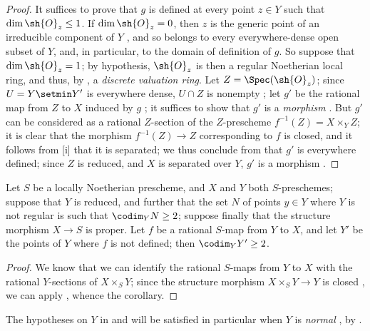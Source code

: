 \begin{proof}
It suffices to prove that $g$ is defined at every point $z\in Y$ such that $\dim\sh{O}_z\leq1$.
If $\dim\sh{O}_z=0$, then $z$ is the generic point of an irreducible component of $Y$ , and so belongs to every everywhere-dense open subset of $Y$, and, in particular, to the domain of definition of $g$.
So suppose that $\dim\sh{O}_z=1$; by hypothesis, $\sh{O}_z$ is then a regular Noetherian local ring, and thus, by , a \emph{discrete valuation ring}.
Let $Z=\Spec(\sh{O}_z)$;
since $U=Y\setmin Y'$ is everywhere dense, $U\cap Z$ is nonempty ;
let $g'$ be the rational map from $Z$ to $X$ induced by $g$ ;
it suffices to show that $g'$ is a \emph{morphism} .
But $g'$ can be considered as a rational $Z$-section of the $Z$-prescheme $f^{-1}(Z)=X\times_Y Z$;
it is clear that the morphism $f^{-1}(Z)\to Z$ corresponding to $f$ is closed, and it follows from [i] that it is separated;
we thus conclude from  that $g'$ is everywhere defined;
since $Z$ is reduced, and $X$ is separated over $Y$, $g'$ is a morphism .
\end{proof}

\begin{corollary}[7.3.6]
\label{II.7.3.6}
Let $S$ be a locally Noetherian prescheme, and $X$ and $Y$ both $S$-preschemes;
suppose that $Y$ is reduced, and further that the set $N$ of points $y\in Y$ where $Y$ is not regular is such that $\codim_Y N\geq2$;
suppose finally that the structure morphism $X\to S$ is proper.
Let $f$ be a rational $S$-map from $Y$ to $X$, and let $Y'$ be the points of $Y$ where $f$ is not defined;
then $\codim_Y Y'\geq2$.
\end{corollary}

\begin{proof}
We know  that we can identify the rational $S$-maps from $Y$ to $X$ with the rational $Y$-sections of $X\times_S Y$;
since the structure morphism $X\times_S Y\to Y$ is closed , we can apply , whence the corollary.
\end{proof}

\begin{remark}[7.3.7]
\label{II.7.3.7}
The hypotheses on $Y$ in  and  will be satisfied in particular when $Y$ is \emph{normal} , by .
\end{remark}

